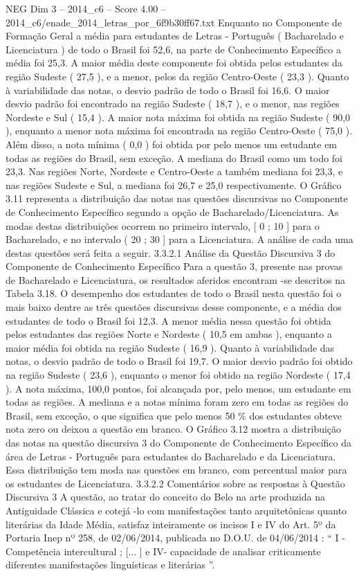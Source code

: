 \begin{textsample}{NEG Dim 3 – 2014\_c6 – Score 4.00 – 2014\_c6/enade\_2014\_letras\_por\_6f9b30ff67.txt}
Enquanto no Componente de Formação Geral a média para estudantes de Letras - Português ( Bacharelado e Licenciatura ) de todo o Brasil foi 52,6, na parte de Conhecimento Específico a média foi 25,3.
A maior média deste componente foi obtida pelos estudantes da região Sudeste ( 27,5 ), e a menor, pelos da região Centro-Oeste ( 23,3 ).
Quanto à variabilidade das notas, o desvio padrão de todo o Brasil foi 16,6.
O maior desvio padrão foi encontrado na região Sudeste ( 18,7 ), e o menor, nas regiões Nordeste e Sul ( 15,4 ).
A maior nota máxima foi obtida na região Sudeste ( 90,0 ), enquanto a menor nota máxima foi encontrada na região Centro-Oeste ( 75,0 ).
Além disso, a nota mínima ( 0,0 ) foi obtida por pelo menos um estudante em todas as regiões do Brasil, sem exceção.
A mediana do Brasil como um todo foi 23,3.
Nas regiões Norte, Nordeste e Centro-Oeste a também mediana foi 23,3, e nas regiões Sudeste e Sul, a mediana foi 26,7 e 25,0 respectivamente.
O Gráfico 3.11 representa a distribuição das notas nas questões discursivas no Componente de Conhecimento Específico segundo a opção de Bacharelado/Licenciatura.
As modas destas distribuições ocorrem no primeiro intervalo, [ 0 ; 10 ] para o Bacharelado, e no intervalo ( 20 ; 30 ] para a Licenciatura.
A análise de cada uma destas questões será feita a seguir. 3.3.2.1 Análise da Questão Discursiva 3 do Componente de Conhecimento Específico Para a questão 3, presente nas provas de Bacharelado e Licenciatura, os resultados aferidos encontram -se descritos na Tabela 3.18.
O desempenho dos estudantes de todo o Brasil nesta questão foi o mais baixo dentre as três questões discursivas desse componente, e a média dos estudantes de todo o Brasil foi 12,3.
A menor média nessa questão foi obtida pelos estudantes das regiões Norte e Nordeste ( 10,5 em ambas ), enquanto a maior média foi obtida na região Sudeste ( 16,9 ).
Quanto à variabilidade das notas, o desvio padrão de todo o Brasil foi 19,7.
O maior desvio padrão foi obtido na região Sudeste ( 23,6 ), enquanto o menor foi obtido na região Nordeste ( 17,4 ).
A nota máxima, 100,0 pontos, foi alcançada por, pelo menos, um estudante em todas as regiões.
A mediana e a notas mínima foram zero em todas as regiões do Brasil, sem exceção, o que significa que pelo menos 50 \% dos estudantes obteve nota zero ou deixou a questão em branco.
O Gráfico 3.12 mostra a distribuição das notas na questão discursiva 3 do Componente de Conhecimento Específico da área de Letras - Português para estudantes do Bacharelado e da Licenciatura.
Essa distribuição tem moda nas questões em branco, com percentual maior para os estudantes de Licenciatura. 3.3.2.2 Comentários sobre as respostas à Questão Discursiva 3 A questão, ao tratar do conceito do Belo na arte produzida na Antiguidade Clássica e cotejá -lo com manifestações tanto arquitetônicas quanto literárias da Idade Média, satisfaz inteiramente os incisos I e IV do Art. 5º da Portaria Inep nº 258, de 02/06/2014, publicada no D.O.U. de 04/06/2014 : “ I - Competência intercultural ; [... ] e IV- capacidade de analisar criticamente diferentes manifestações linguísticas e literárias ”.

\end{textsample}

